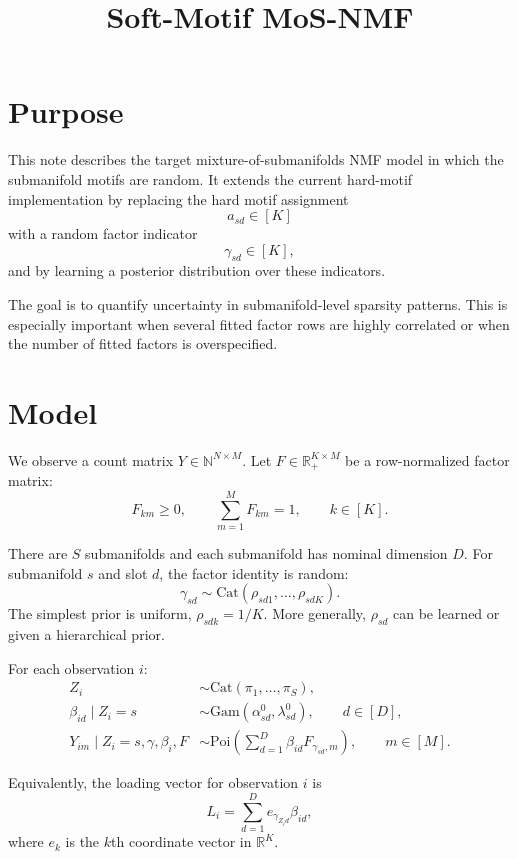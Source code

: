 \documentclass[11pt]{article}
\title{Soft-Motif MoS-NMF}
\author{}
\date{}
\newcommand{\Gam}{\mathrm{Gam}}
\newcommand{\Poi}{\mathrm{Poi}}
\newcommand{\Cat}{\mathrm{Cat}}
\newcommand{\R}{\mathbb{R}}
\newcommand{\N}{\mathbb{N}}
\theoremstyle{definition}
\begin{document}
\maketitle

\section{Purpose}

This note describes the target mixture-of-submanifolds NMF model in which the
submanifold motifs are random. It extends the current hard-motif implementation
by replacing the hard motif assignment
\[
  a_{sd} \in [K]
\]
with a random factor indicator
\[
  \gamma_{sd} \in [K],
\]
and by learning a posterior distribution over these indicators.

The goal is to quantify uncertainty in submanifold-level sparsity patterns.
This is especially important when several fitted factor rows are highly
correlated or when the number of fitted factors is overspecified.

\section{Model}

We observe a count matrix $Y \in \N^{N \times M}$. Let
$F \in \R_+^{K \times M}$ be a row-normalized factor matrix:
\[
  F_{km} \geq 0,
  \qquad
  \sum_{m=1}^{M} F_{km} = 1,
  \qquad k \in [K].
\]

There are $S$ submanifolds and each submanifold has nominal dimension $D$. For
submanifold $s$ and slot $d$, the factor identity is random:
\[
  \gamma_{sd} \sim \Cat(\rho_{sd1},\ldots,\rho_{sdK}).
\]
The simplest prior is uniform, $\rho_{sdk}=1/K$. More generally, $\rho_{sd}$ can
be learned or given a hierarchical prior.

For each observation $i$:
\begin{align}
  Z_i &\sim \Cat(\pi_1,\ldots,\pi_S), \\
  \beta_{id} \mid Z_i=s
    &\sim \Gam(\alpha^0_{sd},\lambda^0_{sd}),
    \qquad d \in [D], \\
  Y_{im} \mid Z_i=s,\gamma,\beta_i,F
    &\sim
    \Poi\left(
      \sum_{d=1}^{D} \beta_{id} F_{\gamma_{sd},m}
    \right),
    \qquad m \in [M].
\end{align}

Equivalently, the loading vector for observation $i$ is
\[
  L_i = \sum_{d=1}^{D} e_{\gamma_{Z_i d}}\beta_{id},
\]
where $e_k$ is the $k$th coordinate vector in $\R^K$.
\end{document}
